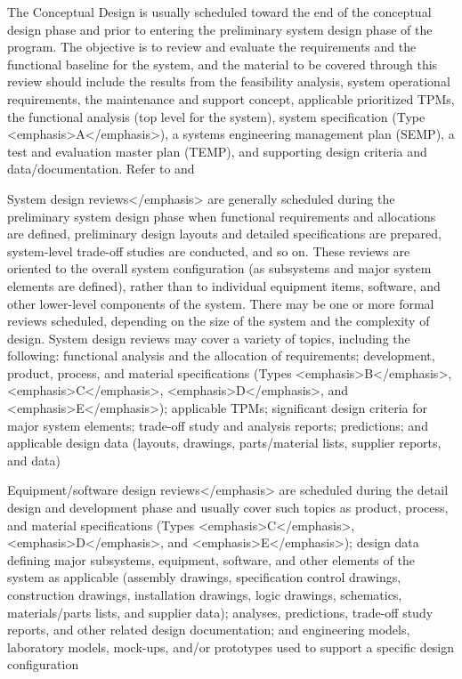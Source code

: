 The Conceptual Design is usually scheduled toward the end of the conceptual design phase and prior to entering the preliminary system design phase of the program. The objective is to review and evaluate the requirements and the functional baseline for the system, and the material to be covered through this review should include the results from the feasibility analysis, system operational requirements, the maintenance and support concept, applicable prioritized TPMs, the functional analysis (top level for the system), system specification (Type <emphasis>A</emphasis>), a systems engineering management plan (SEMP), a test and evaluation master plan (TEMP), and supporting design criteria and data/documentation. Refer to  and 

System design reviews</emphasis> are generally scheduled during the preliminary system design phase when functional requirements and allocations are defined, preliminary design layouts and detailed specifications are prepared, system-level trade-off studies are conducted, and so on. These reviews are oriented to the overall system configuration (as subsystems and major system elements are defined), rather than to individual equipment items, software, and other lower-level components of the system. There may be one or more formal reviews scheduled, depending on the size of the system and the complexity of design. System design reviews may cover a variety of topics, including the following: functional analysis and the allocation of requirements; development, product, process, and material specifications (Types <emphasis>B</emphasis>, <emphasis>C</emphasis>, <emphasis>D</emphasis>, and <emphasis>E</emphasis>); applicable TPMs; significant design criteria for major system elements; trade-off study and analysis reports; predictions; and applicable design data (layouts, drawings, parts/material lists, supplier reports, and data)

Equipment/software design reviews</emphasis> are scheduled during the detail design and development phase and usually cover such topics as product, process, and material specifications (Types <emphasis>C</emphasis>, <emphasis>D</emphasis>, and <emphasis>E</emphasis>); design data defining major subsystems, equipment, software, and other elements of the system as applicable (assembly drawings, specification control drawings, construction drawings, installation drawings, logic drawings, schematics, materials/parts lists, and supplier data); analyses, predictions, trade-off study reports, and other related design documentation; and engineering models, laboratory models, mock-ups, and/or prototypes used to support a specific design configuration

